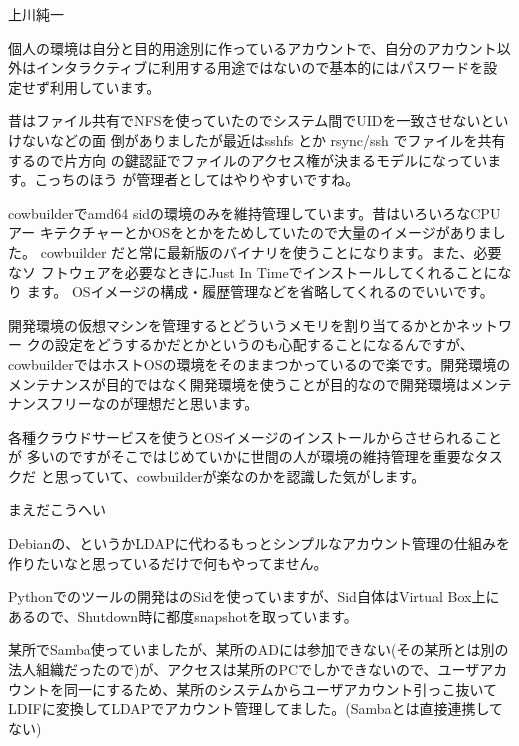 \begin{prework}{ 上川純一 }


個人の環境は自分と目的用途別に作っているアカウントで、自分のアカウント以
外はインタラクティブに利用する用途ではないので基本的にはパスワードを設
定せず利用しています。

昔はファイル共有でNFSを使っていたのでシステム間でUIDを一致させないといけないなどの面
倒がありましたが最近はsshfs とか rsync/ssh でファイルを共有するので片方向
の鍵認証でファイルのアクセス権が決まるモデルになっています。こっちのほう
が管理者としてはやりやすいですね。


cowbuilderでamd64 sidの環境のみを維持管理しています。昔はいろいろなCPUアー
 キテクチャーとかOSをとかをためしていたので大量のイメージがありました。
cowbuilder だと常に最新版のバイナリを使うことになります。また、必要なソ
 フトウェアを必要なときにJust In Timeでインストールしてくれることになり
 ます。
OSイメージの構成・履歴管理などを省略してくれるのでいいです。

開発環境の仮想マシンを管理するとどういうメモリを割り当てるかとかネットワー
クの設定をどうするかだとかというのも心配することになるんですが、
cowbuilderではホストOSの環境をそのままつかっているので楽です。開発環境の
メンテナンスが目的ではなく開発環境を使うことが目的なので開発環境はメンテ
ナンスフリーなのが理想だと思います。

各種クラウドサービスを使うとOSイメージのインストールからさせられることが
多いのですがそこではじめていかに世間の人が環境の維持管理を重要なタスクだ
と思っていて、cowbuilderが楽なのかを認識した気がします。

\end{prework}

\begin{prework}{ まえだこうへい }


Debianの、というかLDAPに代わるもっとシンプルなアカウント管理の仕組みを作りたいなと思っているだけで何もやってません。


Pythonでのツールの開発はのSidを使っていますが、Sid自体はVirtual Box上にあるので、Shutdown時に都度snapshotを取っています。


某所でSamba使っていましたが、某所のADには参加できない(その某所とは別の法人組織だったので)が、アクセスは某所のPCでしかできないので、ユーザアカウントを同一にするため、某所のシステムからユーザアカウント引っこ抜いてLDIFに変換してLDAPでアカウント管理してました。(Sambaとは直接連携してない)
\end{prework}

